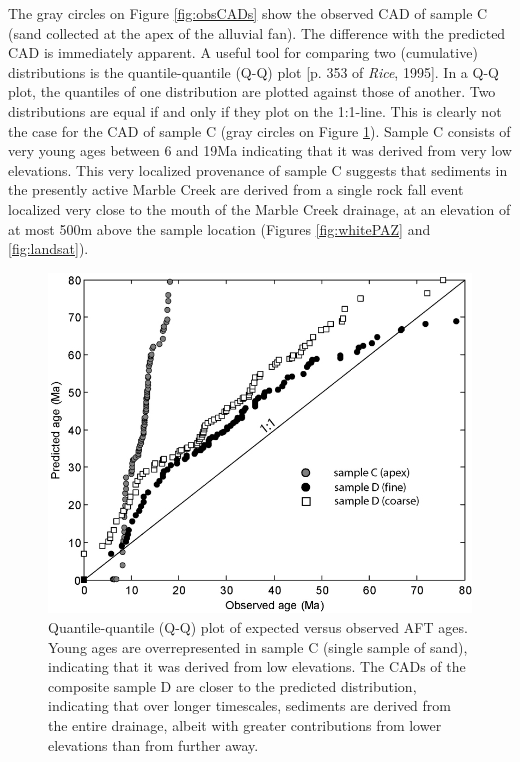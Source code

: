 \documentclass[12pt,twoside]{article}
\begin{document}
The gray circles on Figure  \ref{fig:obsCADs} show the observed CAD of
sample  C (sand  collected  at the  apex  of the  alluvial fan).   The
difference with  the predicted CAD is immediately  apparent.  A useful
tool   for   comparing   two   (cumulative)   distributions   is   the
quantile-quantile (Q-Q) plot  [p.  353 of {\it Rice},  1995]. In a Q-Q
plot, the quantiles  of one distribution are plotted  against those of
another.  Two distributions are equal if  and only if they plot on the
1:1-line.  This is clearly not the  case for the CAD of sample C (gray
circles on  Figure \ref{fig:QQplot}). Sample C consists  of very young
ages between 6  and 19Ma indicating that it was  derived from very low
elevations.  This very localized  provenance of sample C suggests that
sediments  in the  presently active  Marble Creek  are derived  from a
single rock fall event localized very close to the mouth of the Marble
Creek  drainage, at  an elevation  of at  most 500m  above  the sample
location (Figures \ref{fig:whitePAZ} and \ref{fig:landsat}).
\\

\begin{figure}[here]
  \centering
  \includegraphics[width=.667\textwidth]{fig7.jpg}
  \caption[Q-Q plot]
  {Quantile-quantile (Q-Q) plot of  expected versus observed AFT ages. 
    Young  ages are  overrepresented  in sample  C  (single sample  of
    sand),  indicating that it  was derived  from low  elevations. The
    CADs  of  the composite  sample  D  are  closer to  the  predicted
    distribution,  indicating that  over longer  timescales, sediments
    are  derived  from  the   entire  drainage,  albeit  with  greater
    contributions from lower elevations than from further away.}
\label{fig:QQplot}
\end{figure}
\end{document}
